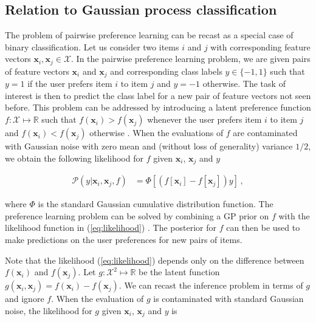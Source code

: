 \subsection{Relation to Gaussian process classification\label{sec:prefKernel}}

The problem of pairwise preference learning can be recast as a special case of binary classification.
Let us consider two items $i$ and $j$ with corresponding feature vectors $\mathbf{x}_i,\mathbf{x}_j\in\mathcal{X}$.
In the pairwise preference learning problem, we are given pairs of feature vectors $\mathbf{x}_i$ and $\mathbf{x}_j$
and corresponding class labels $y\in\{-1,1\}$ such that $y=1$ if the user prefers item $i$ to item $j$
and $y=-1$ otherwise. The task of interest is then to predict the class label for a new pair of feature vectors
not seen before.
This problem can be addressed by introducing a latent preference function $f:\mathcal{X}\mapsto \mathbb{R}$ such that
$f(\mathbf{x}_i) > f(\mathbf{x}_j)$ whenever the user prefers item $i$ to item $j$
and $f(\mathbf{x}_i) < f(\mathbf{x}_j)$ otherwise \cite{chu2005}.
When the evaluations of $f$ are contaminated with Gaussian
noise with zero mean and (without loss of generality) variance $1/2$, we obtain the following likelihood for $f$
given $\mathbf{x}_i$, $\mathbf{x}_j$ and $y$

\vspace{-0.65cm}
{\small
\begin{align}
\mathcal{P}(y|\mathbf{x}_i,\mathbf{x}_j,f) &= \Phi[(f[\mathbf{x}_i] - f[\mathbf{x}_j])y]\,,\label{eq:likelihood}
\end{align}
}

\vspace{-0.7cm}
\normalsize where $\Phi$ is the standard Gaussian cumulative distribution function.
The preference learning problem can be solved by combining a GP prior on $f$
with the likelihood function in (\ref{eq:likelihood}) \cite{chu2005}. The posterior for $f$ can
then be used to make predictions on the user preferences for new pairs of items.

Note that the likelihood (\ref{eq:likelihood}) depends only on the difference between $f(\mathbf{x}_i)$ and $f(\mathbf{x}_j)$.
Let $g:\mathcal{X}^2\mapsto\mathbb{R}$ be the latent function $g(\mathbf{x}_i,\mathbf{x}_j) = f(\mathbf{x}_i) - f(\mathbf{x}_j)$.
We can recast the inference problem in terms of $g$ and ignore $f$. When the evaluation of $g$ is contaminated with standard Gaussian noise,
the likelihood for $g$ given $\mathbf{x}_i$, $\mathbf{x}_j$ and $y$ is

